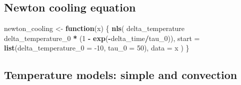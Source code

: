 \documentclass[]{book}
\newenvironment{Shaded}{\begin{snugshade}}{\end{snugshade}}
\newcommand{\ControlFlowTok}[1]{\textcolor[rgb]{0.13,0.29,0.53}{\textbf{#1}}}
\newcommand{\DataTypeTok}[1]{\textcolor[rgb]{0.13,0.29,0.53}{#1}}
\newcommand{\DecValTok}[1]{\textcolor[rgb]{0.00,0.00,0.81}{#1}}
\newcommand{\KeywordTok}[1]{\textcolor[rgb]{0.13,0.29,0.53}{\textbf{#1}}}
\newcommand{\NormalTok}[1]{#1}
\newcommand{\OperatorTok}[1]{\textcolor[rgb]{0.81,0.36,0.00}{\textbf{#1}}}
\newcommand{\StringTok}[1]{\textcolor[rgb]{0.31,0.60,0.02}{#1}}
\begin{document}
\hypertarget{newton-cooling-equation}{%
\subsection{Newton cooling equation}\label{newton-cooling-equation}}

\begin{Shaded}
\begin{Highlighting}[]
\NormalTok{newton_cooling <-}\StringTok{ }\ControlFlowTok{function}\NormalTok{(x) \{}
  \KeywordTok{nls}\NormalTok{(}
\NormalTok{    delta_temperature }\OperatorTok{~}\StringTok{ }\NormalTok{delta_temperature_}\DecValTok{0} \OperatorTok{*}\StringTok{ }\NormalTok{(}\DecValTok{1} \OperatorTok{-}\StringTok{ }\KeywordTok{exp}\NormalTok{(}\OperatorTok{-}\NormalTok{delta_time}\OperatorTok{/}\NormalTok{tau_}\DecValTok{0}\NormalTok{)),}
    \DataTypeTok{start =} \KeywordTok{list}\NormalTok{(}\DataTypeTok{delta_temperature_0 =} \DecValTok{-10}\NormalTok{, }\DataTypeTok{tau_0 =} \DecValTok{50}\NormalTok{),}
    \DataTypeTok{data =}\NormalTok{ x}
\NormalTok{  )}
\NormalTok{\}}
\end{Highlighting}
\end{Shaded}

\hypertarget{temperature-models-simple-and-convection}{%
\subsection{Temperature models: simple and convection}\label{temperature-models-simple-and-convection}}
\end{document}
